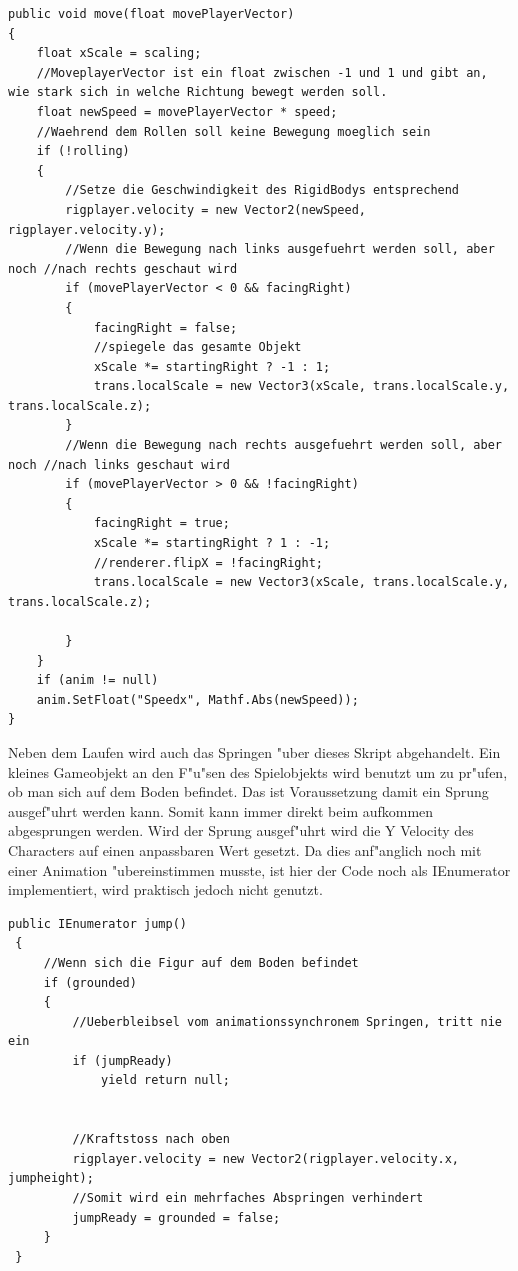 \begin{lstlisting}[breaklines=true] 
public void move(float movePlayerVector)
{
	float xScale = scaling;
	//MoveplayerVector ist ein float zwischen -1 und 1 und gibt an, wie stark sich in welche Richtung bewegt werden soll.
	float newSpeed = movePlayerVector * speed;
	//Waehrend dem Rollen soll keine Bewegung moeglich sein
	if (!rolling)
	{
		//Setze die Geschwindigkeit des RigidBodys entsprechend
		rigplayer.velocity = new Vector2(newSpeed, rigplayer.velocity.y);
		//Wenn die Bewegung nach links ausgefuehrt werden soll, aber noch //nach rechts geschaut wird
		if (movePlayerVector < 0 && facingRight)
		{
			facingRight = false;
			//spiegele das gesamte Objekt 
			xScale *= startingRight ? -1 : 1;
			trans.localScale = new Vector3(xScale, trans.localScale.y, trans.localScale.z);
		}
		//Wenn die Bewegung nach rechts ausgefuehrt werden soll, aber noch //nach links geschaut wird
		if (movePlayerVector > 0 && !facingRight)
		{
			facingRight = true;
			xScale *= startingRight ? 1 : -1;
			//renderer.flipX = !facingRight;
			trans.localScale = new Vector3(xScale, trans.localScale.y, trans.localScale.z);
			
		}
	}
	if (anim != null)
	anim.SetFloat("Speedx", Mathf.Abs(newSpeed));
}
\end{lstlisting}

Neben dem Laufen wird auch das Springen "uber dieses Skript abgehandelt.
Ein kleines Gameobjekt an den F"u"sen des Spielobjekts wird benutzt um zu pr"ufen, ob man sich auf dem Boden befindet. Das ist Voraussetzung damit ein Sprung ausgef"uhrt werden kann. Somit kann immer direkt beim aufkommen abgesprungen werden. Wird der Sprung ausgef"uhrt wird die Y Velocity des Characters auf einen anpassbaren Wert gesetzt.
Da dies anf"anglich noch mit einer Animation "ubereinstimmen musste, ist hier der Code noch als IEnumerator implementiert, wird praktisch jedoch nicht genutzt.

\begin{lstlisting}[breaklines=true]
 public IEnumerator jump()
 {
	 //Wenn sich die Figur auf dem Boden befindet
	 if (grounded)
	 {
		 //Ueberbleibsel vom animationssynchronem Springen, tritt nie ein
		 if (jumpReady)
			 yield return null;  
			 
			 
		 //Kraftstoss nach oben
		 rigplayer.velocity = new Vector2(rigplayer.velocity.x, jumpheight);
		 //Somit wird ein mehrfaches Abspringen verhindert
		 jumpReady = grounded = false;
	 }
 }
\end{lstlisting}


